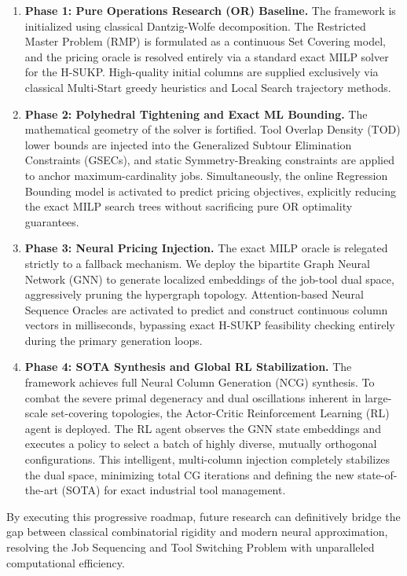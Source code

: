 \documentclass[11pt, a4paper]{book}
\begin{document}
	\begin{enumerate}
		\item \textbf{Phase 1: Pure Operations Research (OR) Baseline.} 
		The framework is initialized using classical Dantzig-Wolfe decomposition. The Restricted Master Problem (RMP) is formulated as a continuous Set Covering model, and the pricing oracle is resolved entirely via a standard exact MILP solver for the H-SUKP. High-quality initial columns are supplied exclusively via classical Multi-Start greedy heuristics and Local Search trajectory methods.
		
		\item \textbf{Phase 2: Polyhedral Tightening and Exact ML Bounding.} 
		The mathematical geometry of the solver is fortified. Tool Overlap Density (TOD) lower bounds are injected into the Generalized Subtour Elimination Constraints (GSECs), and static Symmetry-Breaking constraints are applied to anchor maximum-cardinality jobs. Simultaneously, the online Regression Bounding model is activated to predict pricing objectives, explicitly reducing the exact MILP search trees without sacrificing pure OR optimality guarantees.
		
		\item \textbf{Phase 3: Neural Pricing Injection.} 
		The exact MILP oracle is relegated strictly to a fallback mechanism. We deploy the bipartite Graph Neural Network (GNN) to generate localized embeddings of the job-tool dual space, aggressively pruning the hypergraph topology. Attention-based Neural Sequence Oracles are activated to predict and construct continuous column vectors in milliseconds, bypassing exact H-SUKP feasibility checking entirely during the primary generation loops.
		
		\item \textbf{Phase 4: SOTA Synthesis and Global RL Stabilization.} 
		The framework achieves full Neural Column Generation (NCG) synthesis. To combat the severe primal degeneracy and dual oscillations inherent in large-scale set-covering topologies, the Actor-Critic Reinforcement Learning (RL) agent is deployed. The RL agent observes the GNN state embeddings and executes a policy to select a batch of highly diverse, mutually orthogonal configurations. This intelligent, multi-column injection completely stabilizes the dual space, minimizing total CG iterations and defining the new state-of-the-art (SOTA) for exact industrial tool management.
	\end{enumerate}
	
	By executing this progressive roadmap, future research can definitively bridge the gap between classical combinatorial rigidity and modern neural approximation, resolving the Job Sequencing and Tool Switching Problem with unparalleled computational efficiency.
	
	
\end{document}
